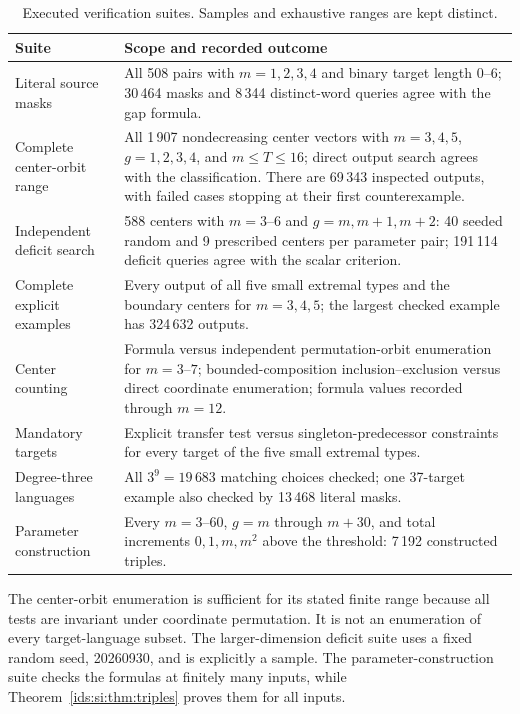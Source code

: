 \documentclass[11pt,letterpaper]{article}
\theoremstyle{definition}\newtheorem{definition}[theorem]{Definition}
\theoremstyle{remark}\newtheorem{remark}[theorem]{Remark}
\theoremstyle{definition}\newtheorem{question}[theorem]{Question}
\begin{document}
\begin{table}[htbp]
\centering\small
\caption{Executed verification suites. Samples and exhaustive ranges are
kept distinct.}
\label{ids:si:tab:verification}
\begin{tabular}{@{}p{.30\linewidth}p{.63\linewidth}@{}}
\toprule
Suite & Scope and recorded outcome\\
\midrule
Literal source masks & All 508 pairs with $m=1,2,3,4$ and binary target
length $0$--$6$; 30\,464 masks and 8\,344 distinct-word queries agree with
the gap formula.\\[2mm]
Complete center-orbit range & All 1\,907 nondecreasing center vectors with
$m=3,4,5$, $g=1,2,3,4$, and $m\leq T\leq16$; direct output search agrees
with the classification. There are 69\,343 inspected outputs, with failed
cases stopping at their first counterexample.\\[2mm]
Independent deficit search & 588 centers with $m=3$--$6$ and
$g=m,m+1,m+2$: 40 seeded random and 9 prescribed centers per parameter pair;
191\,114 deficit queries agree with the scalar criterion.\\[2mm]
Complete explicit examples & Every output of all five small extremal types
and the boundary centers for $m=3,4,5$; the largest checked example has
324\,632 outputs.\\[2mm]
Center counting & Formula versus independent permutation-orbit enumeration
for $m=3$--$7$; bounded-composition inclusion--exclusion versus direct
coordinate enumeration; formula values recorded through $m=12$.\\[2mm]
Mandatory targets & Explicit transfer test versus singleton-predecessor
constraints for every target of the five small extremal types.\\[2mm]
Degree-three languages & All $3^9=19\,683$ matching choices checked;
one 37-target example also checked by 13\,468 literal masks.\\[2mm]
Parameter construction & Every $m=3$--$60$, $g=m$ through $m+30$, and total
increments $0,1,m,m^2$ above the threshold: 7\,192 constructed triples.\\
\bottomrule
\end{tabular}
\end{table}

The center-orbit enumeration is sufficient for its stated finite range
because all tests are invariant under coordinate permutation. It is not an
enumeration of every target-language subset. The larger-dimension deficit
suite uses a fixed random seed, 20260930, and is explicitly a sample.
The parameter-construction suite checks the formulas at finitely many
inputs, while Theorem~\ref{ids:si:thm:triples} proves them for all inputs.
\end{document}
